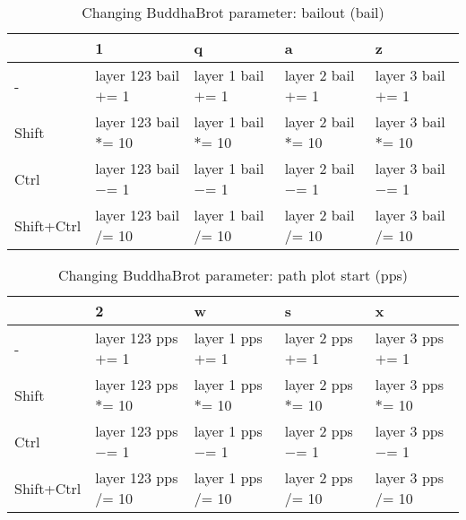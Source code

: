 \documentclass[10pt,a4paper]{article}
\begin{document}
\begin{table}[h!]
    \caption{Changing BuddhaBrot parameter: bailout (bail)}
    \setlength{\tabcolsep}{0.0pt}
    \begin{tabularx}{\linewidth}{LLLLL}
        \toprule
                   & 1                      & q                    & a                    & z                    \\
        \midrule                                                                          
        -          & layer 123 bail $+$= 1  & layer 1 bail $+$= 1  & layer 2 bail $+$= 1  & layer 3 bail $+$= 1  \\
        Shift      & layer 123 bail $*$= 10 & layer 1 bail $*$= 10 & layer 2 bail $*$= 10 & layer 3 bail $*$= 10 \\
        Ctrl       & layer 123 bail $-$= 1  & layer 1 bail $-$= 1  & layer 2 bail $-$= 1  & layer 3 bail $-$= 1  \\
        Shift+Ctrl & layer 123 bail $/$= 10 & layer 1 bail $/$= 10 & layer 2 bail $/$= 10 & layer 3 bail $/$= 10 \\
        \bottomrule
    \end{tabularx}
\end{table}

\begin{table}[h!]
    \caption{Changing BuddhaBrot parameter: path plot start (pps)}
    \setlength{\tabcolsep}{0.0pt}
    \begin{tabularx}{\linewidth}{LLLLL}
        \toprule
                   & 2                      & w                    & s                    & x                    \\
        \midrule                                                                          
        -          & layer 123 pps $+$= 1  & layer 1 pps $+$= 1  & layer 2 pps $+$= 1  & layer 3 pps $+$= 1  \\
        Shift      & layer 123 pps $*$= 10 & layer 1 pps $*$= 10 & layer 2 pps $*$= 10 & layer 3 pps $*$= 10 \\
        Ctrl       & layer 123 pps $-$= 1  & layer 1 pps $-$= 1  & layer 2 pps $-$= 1  & layer 3 pps $-$= 1  \\
        Shift+Ctrl & layer 123 pps $/$= 10 & layer 1 pps $/$= 10 & layer 2 pps $/$= 10 & layer 3 pps $/$= 10 \\
        \bottomrule
    \end{tabularx}
\end{table}
\end{document}
